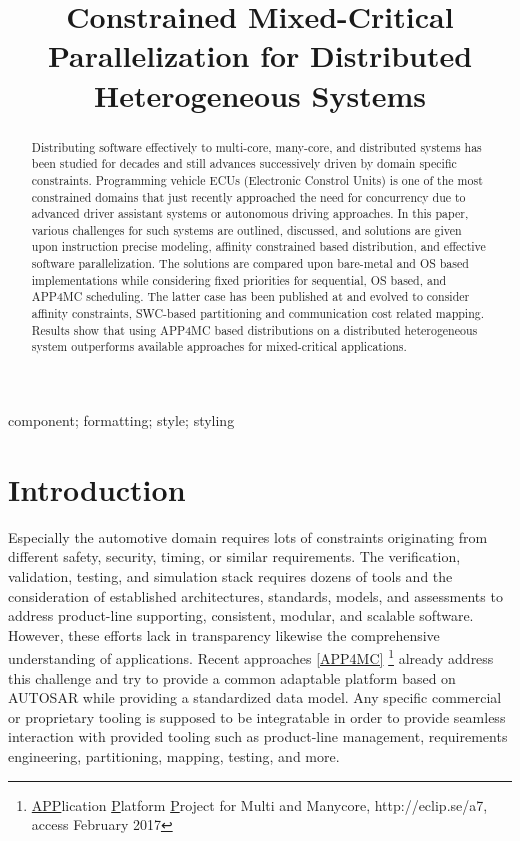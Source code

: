 \documentclass [a4paper,final,conference,10pt]{IDAACS}
\title{Constrained Mixed-Critical Parallelization for Distributed Heterogeneous Systems}
\author{
\IEEEauthorblockN{Robert Höttger\IEEEauthorrefmark{1}, Mustafa Özcelikörs\IEEEauthorrefmark{1}}

\IEEEauthorblockA{\IEEEauthorrefmark{1}Dortmund University of Applied Sciences and Arts - IDiAL Institute, \\\{robert.hoettger, mustafa.ozcelikors\}@fh-dortmund.de, www.idial.org\\
	}
}
\begin{document}
\maketitle

\let\thefootnote\relax{}

\begin{abstract}
Distributing software effectively to multi-core, many-core, and distributed systems has been studied for decades and still advances successively driven by domain specific constraints. Programming vehicle ECUs (Electronic Constrol Units) is one of the most constrained domains that just recently approached the need for concurrency due to advanced driver assistant systems or autonomous driving approaches. In this paper, various challenges for such systems are outlined, discussed, and solutions are given upon instruction precise modeling, affinity constrained based distribution, and effective software parallelization. The solutions are compared upon bare-metal and OS based implementations while considering fixed priorities for sequential, OS based, and APP4MC scheduling. The latter case has been published at \cite{ICPDSSE} and evolved to consider affinity constraints, SWC-based partitioning and communication cost related mapping. Results show that using APP4MC based distributions on a distributed heterogeneous system outperforms available approaches for mixed-critical applications. %

\end{abstract}

\begin{IEEEkeywords}
component; formatting; style; styling
\end{IEEEkeywords}

\section{Introduction}

Especially the automotive domain requires lots of constraints originating from different safety, security, timing, or similar requirements. The verification, validation, testing, and simulation stack requires dozens of tools and the consideration of established architectures, standards, models, and assessments to address product-line supporting, consistent, modular, and scalable software. However, these efforts lack in transparency likewise the comprehensive understanding of applications. Recent approaches \ref{APP4MC} \footnote{\underline{APP}lication \underline{P}latform \underline{P}roject for Multi and Manycore, http://eclip.se/a7, access February 2017} already address this challenge and try to provide a common adaptable platform based on AUTOSAR while providing a standardized data model. Any specific commercial or proprietary tooling is supposed to be integratable in order to provide seamless interaction with provided tooling such as product-line management, requirements engineering, partitioning, mapping, testing, and more. 
\end{document}
